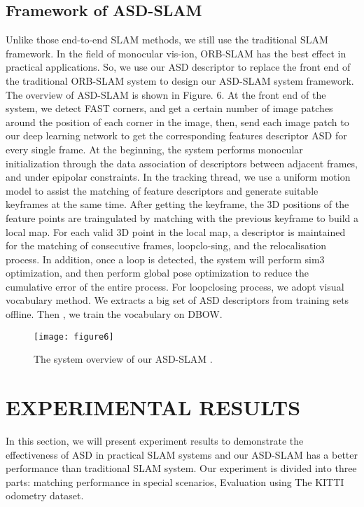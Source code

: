 \documentclass[letterpaper, 10 pt, conference]{ieeeconf}  %
\begin{document}
\subsection{Framework of ASD-SLAM}
Unlike those end-to-end SLAM methods, we still use the traditional SLAM framework. In the field of monocular vis-ion, ORB-SLAM has the best effect in practical applications. So, we use our ASD descriptor to replace the front end of the traditional ORB-SLAM system to design our ASD-SLAM system framework. The overview of ASD-SLAM is shown in Figure. 6.      At the front end of the system, we detect FAST corners, and get a certain number of image patches around the position of each corner in the image, then, send each image patch to our deep learning network to get the corresponding features descriptor ASD for every single frame. At the beginning, the system performs monocular initialization through the data association of descriptors between adjacent frames, and under epipolar constraints. In the tracking thread, we use a uniform motion model to assist the matching of feature descriptors and generate suitable keyframes at the same time. After getting the keyframe, the 3D positions of the feature points are traingulated by matching with the previous keyframe to build a local map. For each valid 3D point in the local map, a descriptor is maintained for the matching of consecutive frames, loopclo-sing, and the relocalisation process. In addition, once a loop is detected, the system will perform sim3 optimization, and then perform global pose optimization to reduce the cumulative error of the entire process.
 For loopclosing process, we adopt visual vocabulary method. We extracts a big set of ASD descriptors from training sets offline. Then , we train the vocabulary on DBOW.

\begin{figure}[h]
\centering
\texttt{[image: figure6]}
\caption{The system overview of our ASD-SLAM .}
\end{figure}
\section{EXPERIMENTAL RESULTS}
In this section, we will present experiment results to demonstrate the effectiveness of ASD in practical SLAM systems and our ASD-SLAM has a better performance than  traditional SLAM system. Our experiment is divided into three parts:  matching performance in special scenarios, Evaluation using The KITTI odometry dataset. 
\end{document}
